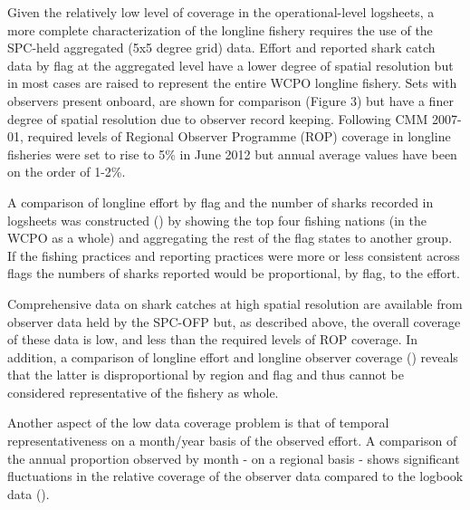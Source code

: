\documentclass[12pt]{SCreport}
\begin{document}
Given the relatively low level of coverage in the operational-level logsheets, a more complete characterization of the longline fishery requires the use of the SPC-held aggregated (5x5 degree grid) data. Effort and reported shark catch data by flag at the aggregated level have a lower degree of spatial resolution but in most cases are raised to represent the entire WCPO longline fishery. Sets with observers present onboard, are shown for comparison (Figure 3) but have a finer degree of spatial resolution due to observer record keeping. Following CMM 2007-01, required levels of Regional Observer Programme (ROP) coverage in longline fisheries were set to rise to 5\% in June 2012 but annual average values have been on the order of 1-2\%.

A comparison of longline effort by flag and the number of sharks recorded in logsheets was constructed () by showing the top four fishing nations (in the WCPO as a whole) and aggregating the rest of the flag states to another group. If the fishing practices and reporting practices were more or less consistent across flags the numbers of sharks reported would be proportional, by flag, to the effort.

Comprehensive data on shark catches at high spatial resolution are available from observer data held by the SPC-OFP but, as described above, the overall coverage of these data is low, and less than the required levels of ROP coverage. In addition, a comparison of longline effort and longline observer coverage () reveals that the latter is disproportional by region and flag and thus cannot be considered representative of the fishery as whole.

Another aspect of the low data coverage problem is that of temporal representativeness on a month/year basis of the observed effort. A comparison of the annual proportion observed by month - on a regional basis - shows significant fluctuations in the relative coverage of the observer data compared to the logbook data ().
\end{document}
